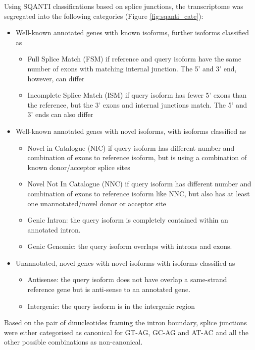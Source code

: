 \label{section: sqanti_annotations}
Using SQANTI classifications based on splice junctions, the transcriptome was segregated into the following categories (Figure \ref{fig:sqanti_cate}): 
\begin{itemize}
	\item Well-known annotated genes with known isoforms, further isoforms classified as
	\begin{itemize}
		\item Full Splice Match (FSM) if reference and query isoform have the same number of exons with matching internal junction. The 5’ and 3’ end, however, can differ 
		\item Incomplete Splice Match (ISM) if query isoform has fewer 5’ exons than the reference, but the 3’ exons and internal junctions match. The 5’ and 3’ ends can also differ 
	\end{itemize}
	\item Well-known annotated genes with novel isoforms, with isoforms classified as
	\begin{itemize}
		\item Novel in Catalogue (NIC) if query isoform has different number and combination of exons to reference isoform, but is using a combination of known donor/acceptor splice sites 
		\item Novel Not In Catalogue (NNC) if query isoform has different number and combination of exons to reference isoform like NNC, but also has at least one unannotated/novel donor or acceptor site
		\item Genic Intron: the query isoform is completely contained within an annotated intron.
		\item Genic Genomic: the query isoform overlaps with introns and exons.
	\end{itemize}
	\item Unannotated, novel genes with novel isoforms with isoforms classified as
	\begin{itemize}
		\item Antisense: the query isoform does not have overlap a same-strand reference gene but is anti-sense to an annotated gene.
		\item Intergenic: the query isoform is in the intergenic region
	\end{itemize}
\end{itemize}

Based on the pair of dinucleotides framing the intron boundary, splice junctions were either categorised as canonical for GT-AG, GC-AG and AT-AC and all the other possible combinations as non-canonical.  

